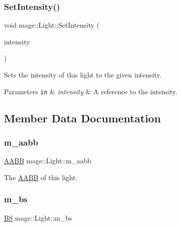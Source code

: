 \subsubsection{\texorpdfstring{Set\+Intensity()}{SetIntensity()}\hspace{0.1cm}{\footnotesize\ttfamily [2/2]}}
{\footnotesize\ttfamily void mage\+::\+Light\+::\+Set\+Intensity (\begin{DoxyParamCaption}\item[{\hyperlink{structmage_1_1_r_g_b_spectrum}{R\+G\+B\+Spectrum} \&\&}]{intensity }\end{DoxyParamCaption})\hspace{0.3cm}{\ttfamily [noexcept]}}

Sets the intensity of this light to the given intensity.


\begin{DoxyParams}[1]{Parameters}
\mbox{\tt in}  & {\em intensity} & A reference to the intensity. \\
\hline
\end{DoxyParams}


\subsection{Member Data Documentation}
\hypertarget{classmage_1_1_light_a2c9190a763a1f37f7639a02bef01279d}{}\label{classmage_1_1_light_a2c9190a763a1f37f7639a02bef01279d} 
\subsubsection{\texorpdfstring{m\+\_\+aabb}{m\_aabb}}
{\footnotesize\ttfamily \hyperlink{structmage_1_1_a_a_b_b}{A\+A\+BB} mage\+::\+Light\+::m\+\_\+aabb\hspace{0.3cm}{\ttfamily [private]}}

The \hyperlink{structmage_1_1_a_a_b_b}{A\+A\+BB} of this light. \hypertarget{classmage_1_1_light_a926df9e12442c630d252fae852b8fc57}{}\label{classmage_1_1_light_a926df9e12442c630d252fae852b8fc57} 
\subsubsection{\texorpdfstring{m\+\_\+bs}{m\_bs}}
{\footnotesize\ttfamily \hyperlink{structmage_1_1_b_s}{BS} mage\+::\+Light\+::m\+\_\+bs\hspace{0.3cm}{\ttfamily [private]}}

